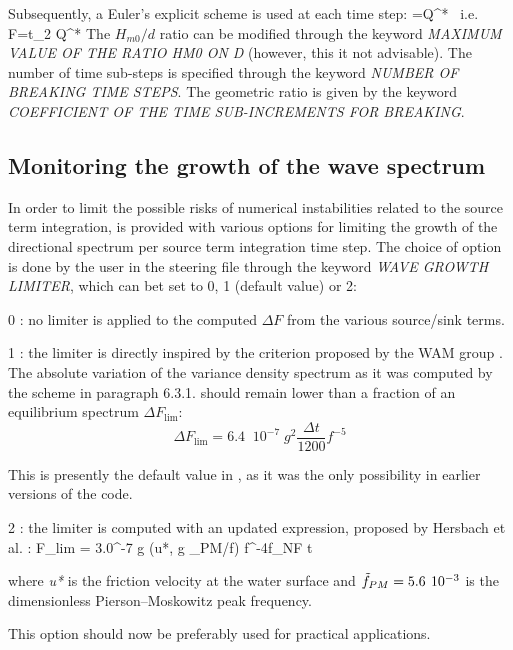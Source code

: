 Subsequently, a Euler's explicit scheme is used at each time step:
\bequ \label{eq:eulerexpli}
 =Q^* \mbox{ i.e. } \Delta F=\Delta t_{2} Q^*
\eequ
 The $H_{m0}/d$ ratio can be modified through the keyword \textit{MAXIMUM VALUE OF THE RATIO HM0 ON D} (however, this it not advisable). The number of time sub-steps is specified through the keyword \textit{NUMBER OF BREAKING TIME STEPS}. The geometric ratio is given by the keyword \textit{COEFFICIENT OF THE TIME SUB-INCREMENTS FOR BREAKING}.


\subsection{ Monitoring the growth of the wave spectrum }
\label{se:growthlimiter}
 In order to limit the possible risks of numerical instabilities related to the source term integration, \tomawac is provided with various options for limiting the growth of the directional spectrum per source term integration time step. The choice of option is done by the user in the steering file through the keyword\textit{ WAVE GROWTH LIMITER}, which can bet set to 0, 1 (default value) or 2:

 0 : no limiter is applied to the computed $\Delta F$ from the various source/sink terms.

 1 : the limiter is directly inspired by the criterion proposed by the WAM group \cite{Wamdi1988}. The absolute variation of the variance density spectrum as it was computed by the scheme in paragraph 6.3.1. should remain lower than a fraction of an equilibrium spectrum $\Delta F_{\lim }$:
\begin{equation} \label{GrindEQ__6_24_}
\Delta F_{\lim } =6.4\; \; 10^{-7} \; g^{2} \frac{\Delta t}{1200} f^{-5}
\end{equation}

 This is presently the default value in \tomawac, as it was the only possibility in earlier versions of the code.

 2 : the limiter is computed with an updated expression, proposed by Hersbach et al. \cite{Hersbach1999}:
\bequ
\Delta F_{lim} = 3.0^{-7} g \max(u*, g _{PM}/f) f^{-4}f_{NF} \Delta t
\eequ

 where \textit{u*} is the friction velocity at the water surface and $\tilde{f}_{PM} =5.6{\kern 1pt} \; 10^{-3} $ is the dimensionless Pierson--Moskowitz peak frequency.

 This option should now be preferably used for practical applications.

